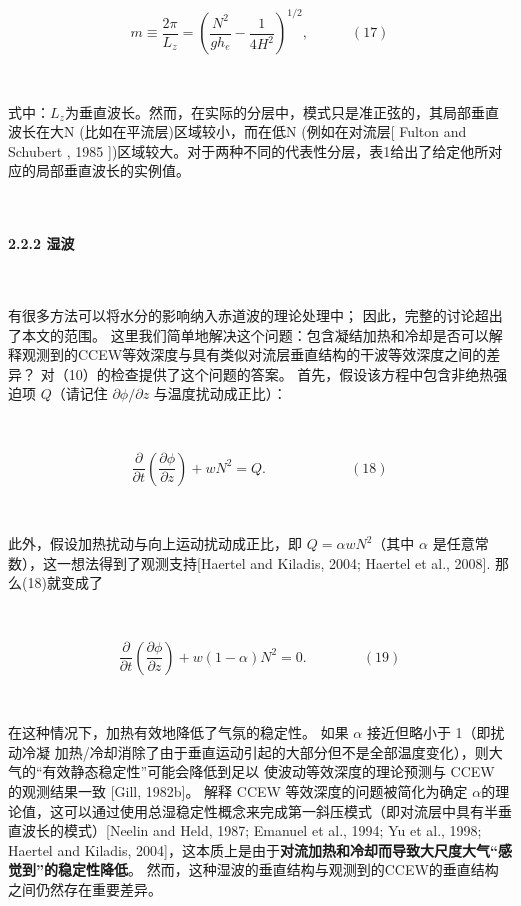 \documentclass{article}
\begin{document}
\begin{CJK*}{UTF8}{gbsn}
\ 

\[m\equiv\frac{2\pi}{L_z}=\left(\frac{N^2}{gh_e}-\frac1{4H^2}\right)^{1/2},\quad\quad\quad(17)\]


\ 

式中：$L_z$为垂直波长。然而，在实际的分层中，模式只是准正弦的，其局部垂直波长在大N (比如在平流层)区域较小，而在低N (例如在对流层[ Fulton and Schubert , 1985 ])区域较大。对于两种不同的代表性分层，表1给出了给定他所对应的局部垂直波长的实例值。


\ 

\paragraph*{2.2.2 湿波}

\ 

有很多方法可以将水分的影响纳入赤道波的理论处理中； 因此，完整的讨论超出了本文的范围。 这里我们简单地解决这个问题：包含凝结加热和冷却是否可以解释观测到的CCEW等效深度与具有类似对流层垂直结构的干波等效深度之间的差异？ 对（10）的检查提供了这个问题的答案。 首先，假设该方程中包含非绝热强迫项 $Q$（请记住 $\partial \phi / \partial z$ 与温度扰动成正比）：


\ 

\[\frac\partial{\partial t}\left(\frac{\partial\phi}{\partial z}\right)+wN^2=Q.\quad\quad\quad\quad\quad\quad(18)\]


\ 


此外，假设加热扰动与向上运动扰动成正比，即 $Q=\alpha w N^2$（其中 $\alpha$ 是任意常数），这一想法得到了观测支持[Haertel and Kiladis, 2004; Haertel et al., 2008]. 那么(18)就变成了

\ 

\[\frac\partial{\partial t}\left(\frac{\partial\phi}{\partial z}\right)+w(1-\alpha)N^2=0.\quad\quad\quad\quad(19)\]


\ 

在这种情况下，加热有效地降低了气氛的稳定性。 如果 $\alpha$ 接近但略小于 1（即扰动冷凝 加热/冷却消除了由于垂直运动引起的大部分但不是全部温度变化），则大气的“有效静态稳定性”可能会降低到足以 使波动等效深度的理论预测与 CCEW 的观测结果一致 [Gill, 1982b]。 解释 CCEW 等效深度的问题被简化为确定 $\alpha$的理论值，这可以通过使用总湿稳定性概念来完成第一斜压模式（即对流层中具有半垂直波长的模式）[Neelin and Held, 1987; Emanuel et al., 1994; Yu et al., 1998; Haertel and Kiladis, 2004]，这本质上是由于\textbf{对流加热和冷却而导致大尺度大气“感觉到”的稳定性降低}。 然而，这种湿波的垂直结构与观测到的CCEW的垂直结构之间仍然存在重要差异。


\ 


\end{CJK*}
\end{document}
